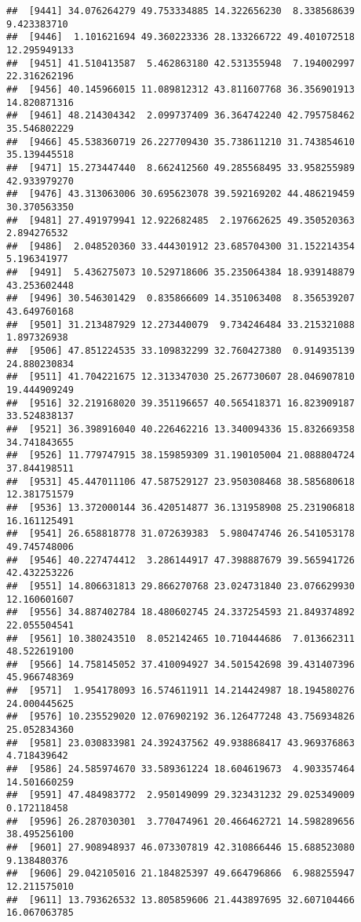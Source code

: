 \documentclass[
]{article}
\begin{document}
\begin{verbatim}
##  [9441] 34.076264279 49.753334885 14.322656230  8.338568639  9.423383710
##  [9446]  1.101621694 49.360223336 28.133266722 49.401072518 12.295949133
##  [9451] 41.510413587  5.462863180 42.531355948  7.194002997 22.316262196
##  [9456] 40.145966015 11.089812312 43.811607768 36.356901913 14.820871316
##  [9461] 48.214304342  2.099737409 36.364742240 42.795758462 35.546802229
##  [9466] 45.538360719 26.227709430 35.738611210 31.743854610 35.139445518
##  [9471] 15.273447440  8.662412560 49.285568495 33.958255989 42.933979270
##  [9476] 43.313063006 30.695623078 39.592169202 44.486219459 30.370563350
##  [9481] 27.491979941 12.922682485  2.197662625 49.350520363  2.894276532
##  [9486]  2.048520360 33.444301912 23.685704300 31.152214354  5.196341977
##  [9491]  5.436275073 10.529718606 35.235064384 18.939148879 43.253602448
##  [9496] 30.546301429  0.835866609 14.351063408  8.356539207 43.649760168
##  [9501] 31.213487929 12.273440079  9.734246484 33.215321088  1.897326938
##  [9506] 47.851224535 33.109832299 32.760427380  0.914935139 24.880230834
##  [9511] 41.704221675 12.313347030 25.267730607 28.046907810 19.444909249
##  [9516] 32.219168020 39.351196657 40.565418371 16.823909187 33.524838137
##  [9521] 36.398916040 40.226462216 13.340094336 15.832669358 34.741843655
##  [9526] 11.779747915 38.159859309 31.190105004 21.088804724 37.844198511
##  [9531] 45.447011106 47.587529127 23.950308468 38.585680618 12.381751579
##  [9536] 13.372000144 36.420514877 36.131958908 25.231906818 16.161125491
##  [9541] 26.658818778 31.072639383  5.980474746 26.541053178 49.745748006
##  [9546] 40.227474412  3.286144917 47.398887679 39.565941726 42.432253226
##  [9551] 14.806631813 29.866270768 23.024731840 23.076629930 12.160601607
##  [9556] 34.887402784 18.480602745 24.337254593 21.849374892 22.055504541
##  [9561] 10.380243510  8.052142465 10.710444686  7.013662311 48.522619100
##  [9566] 14.758145052 37.410094927 34.501542698 39.431407396 45.966748369
##  [9571]  1.954178093 16.574611911 14.214424987 18.194580276 24.000445625
##  [9576] 10.235529020 12.076902192 36.126477248 43.756934826 25.052834360
##  [9581] 23.030833981 24.392437562 49.938868417 43.969376863  4.718439642
##  [9586] 24.585974670 33.589361224 18.604619673  4.903357464 14.501660259
##  [9591] 47.484983772  2.950149099 29.323431232 29.025349009  0.172118458
##  [9596] 26.287030301  3.770474961 20.466462721 14.598289656 38.495256100
##  [9601] 27.908948937 46.073307819 42.310866446 15.688523080  9.138480376
##  [9606] 29.042105016 21.184825397 49.664796866  6.988255947 12.211575010
##  [9611] 13.793626532 13.805859606 21.443897695 32.607104466 16.067063785

\end{verbatim}
\end{document}
